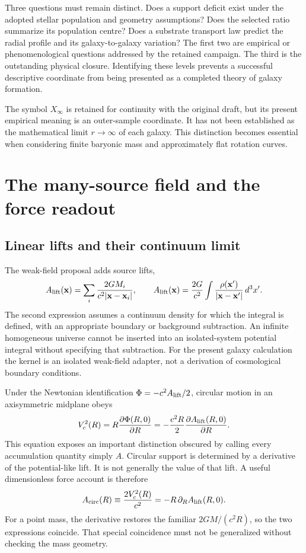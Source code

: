 Three questions must remain distinct. Does a support deficit exist under the adopted stellar population and geometry assumptions? Does the selected ratio summarize its population centre? Does a substrate transport law predict the radial profile and its galaxy-to-galaxy variation? The first two are empirical or phenomenological questions addressed by the retained campaign. The third is the outstanding physical closure. Identifying these levels prevents a successful descriptive coordinate from being presented as a completed theory of galaxy formation.

The symbol $X_\infty$ is retained for continuity with the original draft, but its present empirical meaning is an outer-sample coordinate. It has not been established as the mathematical limit $r\to\infty$ of each galaxy. This distinction becomes essential when considering finite baryonic mass and approximately flat rotation curves.

\section{The many-source field and the force readout}
\subsection{Linear lifts and their continuum limit}

The weak-field proposal adds source lifts,
\begin{equation}
 A_{\rm lift}(\mathbf x)=\sum_i\frac{2GM_i}{c^2|\mathbf x-\mathbf x_i|},\qquad
 A_{\rm lift}(\mathbf x)=\frac{2G}{c^2}\int
 \frac{\rho(\mathbf x')}{|\mathbf x-\mathbf x'|}\,d^3x'.
 \label{c10:lift}
\end{equation}
The second expression assumes a continuum density for which the integral is defined, with an appropriate boundary or background subtraction. An infinite homogeneous universe cannot be inserted into an isolated-system potential integral without specifying that subtraction. For the present galaxy calculation the kernel is an isolated weak-field adapter, not a derivation of cosmological boundary conditions.

Under the Newtonian identification $\Phi=-c^2A_{\rm lift}/2$, circular motion in an axisymmetric midplane obeys
\begin{equation}
 V_c^2(R)=R\frac{\partial\Phi(R,0)}{\partial R}
 =-\frac{c^2R}{2}\frac{\partial A_{\rm lift}(R,0)}{\partial R}.
 \label{c10:force}
\end{equation}
This equation exposes an important distinction obscured by calling every accumulation quantity simply $A$. Circular support is determined by a derivative of the potential-like lift. It is not generally the value of that lift. A useful dimensionless force account is therefore
\begin{equation}
 A_{\rm circ}(R)\equiv\frac{2V_c^2(R)}{c^2}
 =-R\,\partial_R A_{\rm lift}(R,0).
 \label{c10:acirc}
\end{equation}
For a point mass, the derivative restores the familiar $2GM/(c^2R)$, so the two expressions coincide. That special coincidence must not be generalized without checking the mass geometry.

